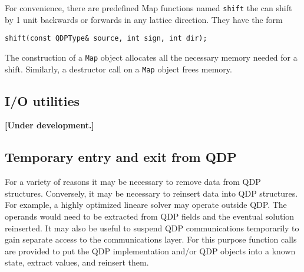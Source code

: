 \documentclass[12pt,letterpaper]{article}
\begin{document}
For convenience, there are predefined Map functions named \verb|shift|
the can shift by 1 unit backwards or forwards in any lattice direction.
They have the form
%
\begin{verbatim}
shift(const QDPType& source, int sign, int dir);
\end{verbatim}

The construction of a \verb|Map| object allocates all the necessary
memory needed for a shift. Similarly, a destructor call on a \verb|Map|
object frees memory.

\subsection{I/O utilities}

{\bf [Under development.]}

\subsection{Temporary entry and exit from QDP}

For a variety of reasons it may be necessary to remove data from QDP
structures.  Conversely, it may be necessary to reinsert data into QDP
structures.  For example, a highly optimized lineare solver may
operate outside QDP.  The operands would need to be extracted from QDP
fields and the eventual solution reinserted.  It may also be useful to
suspend QDP communications temporarily to gain separate access to the
communications layer.  For this purpose function calls are provided to
put the QDP implementation and/or QDP objects into a known state,
extract values, and reinsert them.
\end{document}
